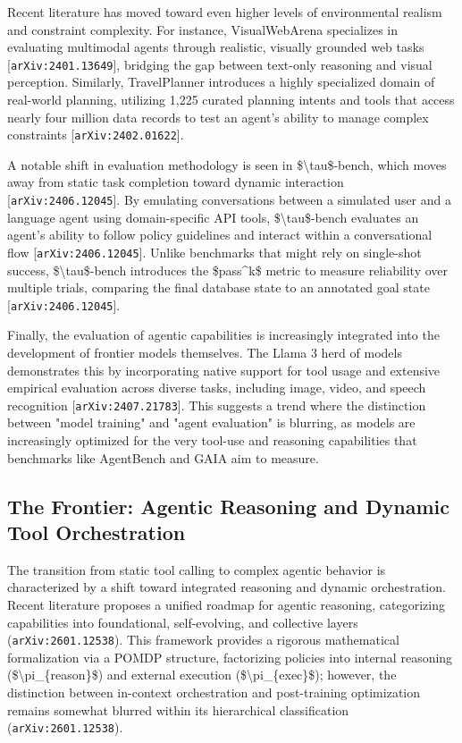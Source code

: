 \documentclass[11pt]{article}
\begin{document}
Recent literature has moved toward even higher levels of environmental realism and constraint complexity. For instance, VisualWebArena specializes in evaluating multimodal agents through realistic, visually grounded web tasks [\texttt{arXiv:2401.13649}], bridging the gap between text-only reasoning and visual perception. Similarly, TravelPlanner introduces a highly specialized domain of real-world planning, utilizing 1,225 curated planning intents and tools that access nearly four million data records to test an agent's ability to manage complex constraints [\texttt{arXiv:2402.01622}].

A notable shift in evaluation methodology is seen in \$\textbackslash{}tau\$-bench, which moves away from static task completion toward dynamic interaction [\texttt{arXiv:2406.12045}]. By emulating conversations between a simulated user and a language agent using domain-specific API tools, \$\textbackslash{}tau\$-bench evaluates an agent's ability to follow policy guidelines and interact within a conversational flow [\texttt{arXiv:2406.12045}]. Unlike benchmarks that might rely on single-shot success, \$\textbackslash{}tau\$-bench introduces the \$pass\textasciicircum{}k\$ metric to measure reliability over multiple trials, comparing the final database state to an annotated goal state [\texttt{arXiv:2406.12045}].

Finally, the evaluation of agentic capabilities is increasingly integrated into the development of frontier models themselves. The Llama 3 herd of models demonstrates this by incorporating native support for tool usage and extensive empirical evaluation across diverse tasks, including image, video, and speech recognition [\texttt{arXiv:2407.21783}]. This suggests a trend where the distinction between "model training" and "agent evaluation" is blurring, as models are increasingly optimized for the very tool-use and reasoning capabilities that benchmarks like AgentBench and GAIA aim to measure.

\subsection{The Frontier: Agentic Reasoning and Dynamic Tool Orchestration}

The transition from static tool calling to complex agentic behavior is characterized by a shift toward integrated reasoning and dynamic orchestration. Recent literature proposes a unified roadmap for agentic reasoning, categorizing capabilities into foundational, self-evolving, and collective layers (\texttt{arXiv:2601.12538}). This framework provides a rigorous mathematical formalization via a POMDP structure, factorizing policies into internal reasoning (\$\textbackslash{}pi\_\{reason\}\$) and external execution (\$\textbackslash{}pi\_\{exec\}\$); however, the distinction between in-context orchestration and post-training optimization remains somewhat blurred within its hierarchical classification (\texttt{arXiv:2601.12538}).
\end{document}

